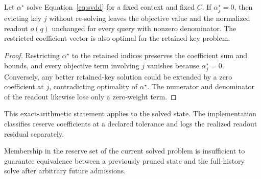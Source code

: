 \begin{proposition}\label{prop:reserve}
Let \(\alpha^\star\) solve Equation~\ref{eq:svdd} for a fixed context and fixed
\(C\). If \(\alpha^\star_j=0\), then evicting key \(j\) without re-solving
leaves the objective value and the normalized readout \(o(q)\) unchanged for
every query with nonzero denominator. The restricted coefficient vector is
also optimal for the retained-key problem.
\end{proposition}

\begin{proof}
Restricting \(\alpha^\star\) to the retained indices preserves the coefficient
sum and bounds, and every objective term involving \(j\) vanishes because
\(\alpha^\star_j=0\). Conversely, any better retained-key solution could be
extended by a zero coefficient at \(j\), contradicting optimality of
\(\alpha^\star\). The numerator and denominator of the readout likewise lose
only a zero-weight term.
\end{proof}

This exact-arithmetic statement applies to the solved state. The implementation
classifies reserve coefficients at a declared tolerance and logs the realized
readout residual separately.

\setlength{\fboxsep}{5pt}
\noindent{}

\begin{proposition}
\label{prop:not-future}
Membership in the reserve set of the current solved problem is insufficient to
guarantee equivalence between a previously pruned state and the full-history
solve after arbitrary future admissions.
\end{proposition}

